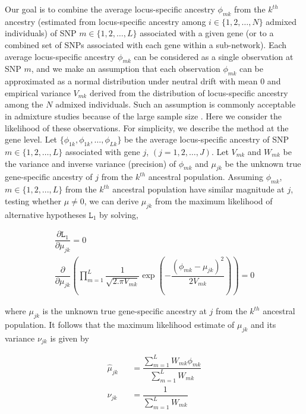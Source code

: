 \documentclass[10pt]{article}
\begin{document}
Our goal is to combine the average locus-specific ancestry $\phi_{mk}$ from the $k^{th}$ ancestry (estimated from locus-specific ancestry among $i \in \lbrace 1,2,\ldots,N \rbrace$ admixed individuals) of SNP $m \in \lbrace 1,2,\ldots,L \rbrace$ associated with a given gene (or to a combined set of SNPs associated with each gene within a sub-network). Each average locus-specific ancestry $\phi_{mk}$ can be considered as a single observation at SNP $m$, and we make an assumption that each observation $\phi_{mk}$ can be approximated as a normal distribution under neutral drift with mean $0$ and empirical variance $V_{mk}$ derived from the distribution of locus-specific ancestry among the $N$ admixed individuals. Such an assumption is commonly acceptable in admixture studies because of the large sample size \cite{pcadm,yael}. Here we consider the likelihood of these observations. For simplicity, we describe the method at the gene level. Let $\lbrace \phi_{1k}, \phi_{1k},\ldots,\phi_{Lk}\rbrace$ be the average locus-specific ancestry of SNP $m \in \lbrace 1,2,\ldots,L \rbrace$ associated with gene $j$, $(j= 1, 2, \ldots,J)$. Let $V_{mk}$ and $W_{mk}$ be the variance and inverse variance (precision) of $\phi_{mk}$ and $\mu_{jk}$ be the unknown true gene-specific ancestry of $j$ from the $k^{th}$ ancestral population. Assuming $\phi_{mk}$, $m \in \lbrace 1,2, ...,L \rbrace$ from the $k^{th}$ ancestral population have similar magnitude at $j$, testing whether $\mu \neq 0$, we can derive $\mu_{jk}$ from the maximum likelihood of alternative hypotheses $\mathtt{L}_{1}$ by solving,

\setlength\arraycolsep{2pt}
\begin{eqnarray}
\dfrac{\partial \mathtt{L}_{1}}{\partial \mu_{jk} } = 0 \nonumber \\[2pt]
\dfrac{\partial}{\partial \mu_{jk}} \left( \prod_{m=1}^{L} \dfrac{1}{\sqrt{2.\pi V_{mk}} } \exp\left(-\dfrac{\left(\phi_{mk}-\mu_{jk} \right)^{2}}{2V_{mk} }\right)\right) = 0 \nonumber
\end{eqnarray}

where $\mu_{jk}$ is the unknown true gene-specific ancestry at $j$ from the $k^{th}$ ancestral population. It follows that the maximum likelihood estimate of $\mu_{jk}$ and its variance $\nu_{jk}$ is given by

\setlength\arraycolsep{2pt}
\begin{eqnarray}
\hat \mu_{jk} &&=  \dfrac{\sum_{m=1}^{L}W_{mk}\phi_{mk}}{\sum_{m=1}^{L}W_{mk}} \label{(8.a)} \\[2pt]
\hat \nu_{jk} &&= \dfrac{1}{\sum_{m=1}^{L}W_{mk}} \nonumber
\end{eqnarray}
\end{document}
